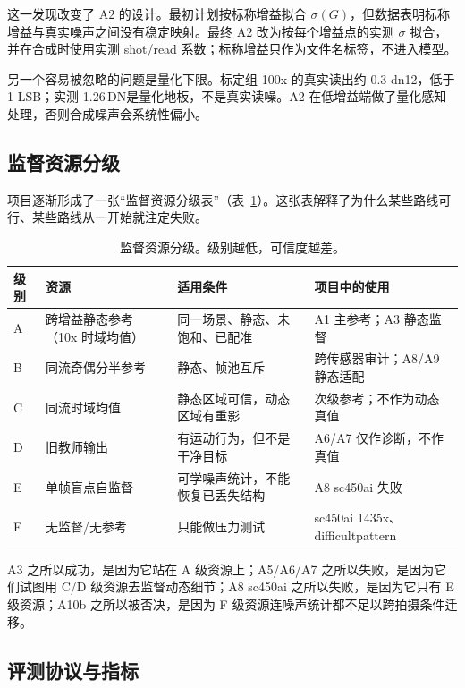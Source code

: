\documentclass[11pt,a4paper,UTF8,fontset=fandol]{ctexart}
\newcommand{\dn}{\ensuremath{\,\mathrm{DN}}}
\begin{document}
这一发现改变了 A2 的设计。最初计划按标称增益拟合 $\sigma(G)$，但数据表明标称增益与真实噪声之间没有稳定映射。最终 A2 改为按每个增益点的实测 $\sigma$ 拟合，并在合成时使用实测 shot/read 系数；标称增益只作为文件名标签，不进入模型。

另一个容易被忽略的问题是量化下限。标定组 100x 的真实读出约 0.3 dn12，低于 1 LSB；实测 1.26\dn 是量化地板，不是真实读噪。A2 在低增益端做了量化感知处理，否则合成噪声会系统性偏小。

\subsection{监督资源分级}

项目逐渐形成了一张“监督资源分级表”（表~\ref{tab:supervision}）。这张表解释了为什么某些路线可行、某些路线从一开始就注定失败。

\begin{table}[H]
\centering
\small
\caption{监督资源分级。级别越低，可信度越差。}
\label{tab:supervision}
\begin{tabular}{p{}p{}p{}p{}}
\toprule
级别 & 资源 & 适用条件 & 项目中的使用 \\
\midrule
A & 跨增益静态参考（10x 时域均值） & 同一场景、静态、未饱和、已配准 & A1 主参考；A3 静态监督 \\
B & 同流奇偶分半参考 & 静态、帧池互斥 & 跨传感器审计；A8/A9 静态适配 \\
C & 同流时域均值 & 静态区域可信，动态区域有重影 & 次级参考；不作为动态真值 \\
D & 旧教师输出 & 有运动行为，但不是干净目标 & A6/A7 仅作诊断，不作真值 \\
E & 单帧盲点自监督 & 可学噪声统计，不能恢复已丢失结构 & A8 sc450ai 失败 \\
F & 无监督/无参考 & 只能做压力测试 & sc450ai 1435x、difficultpattern \\
\bottomrule
\end{tabular}
\end{table}

A3 之所以成功，是因为它站在 A 级资源上；A5/A6/A7 之所以失败，是因为它们试图用 C/D 级资源去监督动态细节；A8 sc450ai 之所以失败，是因为它只有 E 级资源；A10b 之所以被否决，是因为 F 级资源连噪声统计都不足以跨拍摄条件迁移。

\subsection{评测协议与指标}
\end{document}
